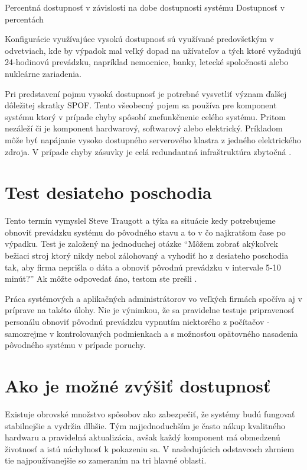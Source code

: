  {Percentná dostupnosť v závislosti na dobe dostupnosti systému \cite{pdf:ha-blueprints}} {Dostupnosť v percentách}

Konfigurácie využívajúce vysokú dostupnosť sú využívané predovšetkým v odvetviach, kde by výpadok mal veľký dopad na užívateľov a tých ktoré vyžadujú 24-hodinovú prevádzku, napríklad nemocnice, banky, letecké spoločnosti alebo nukleárne zariadenia.

Pri predstavení pojmu vysoká dostupnosť je potrebné vysvetliť význam ďalšej dôležitej skratky \ac{SPOF}. Tento všeobecný pojem sa používa pre komponent systému ktorý v prípade chyby spôsobí znefunkčnenie celého systému. Pritom nezáleží či je komponent hardwarový, softwarový alebo elektrický. Príkladom môže byť napájanie vysoko dostupného serverového klastra z jedného elektrického zdroja. V prípade chyby zásuvky je celá redundantná infraštruktúra zbytočná \cite{pdf:ha-blueprints}.

\section{Test desiateho poschodia}
Tento termín vymyslel Steve Traugott a týka sa situácie kedy potrebujeme obnoviť prevádzku systému do pôvodného stavu a to v čo najkratšom čase po výpadku. Test je založený na jednoduchej otázke "`Môžem zobrať akýkoľvek bežiaci stroj ktorý nikdy nebol zálohovaný a vyhodiť ho z desiateho poschodia tak, aby firma neprišla o dáta a obnoviť pôvodnú prevádzku v intervale 5-10 minút?"' Ak môžte odpovedať áno, testom ste prešli \cite{web:infrastructures.org}.

Práca systémových a aplikačných administrátorov vo veľkých firmách spočíva aj v príprave na takéto úlohy. Nie je výnimkou, že sa pravidelne testuje pripravenosť personálu obnoviť pôvodnú prevádzku vypnutím niektorého z počítačov - samozrejme v kontrolovaných podmienkach a s možnosťou opätovného nasadenia pôvodného systému v prípade poruchy.

\section{Ako je možné zvýšiť dostupnosť}

Existuje obrovské množstvo spôsobov ako zabezpečiť, že systémy budú fungovať stabilnejšie a vydržia dlhšie. Tým najjednoduchším je často nákup kvalitného hardwaru a pravidelná aktualizácia, avšak každý komponent má obmedzenú životnosť a istú náchylnosť k pokazeniu sa. V nasledujúcich odstavcoch zhrniem tie najpoužívanejšie so zameraním na tri hlavné oblasti.

